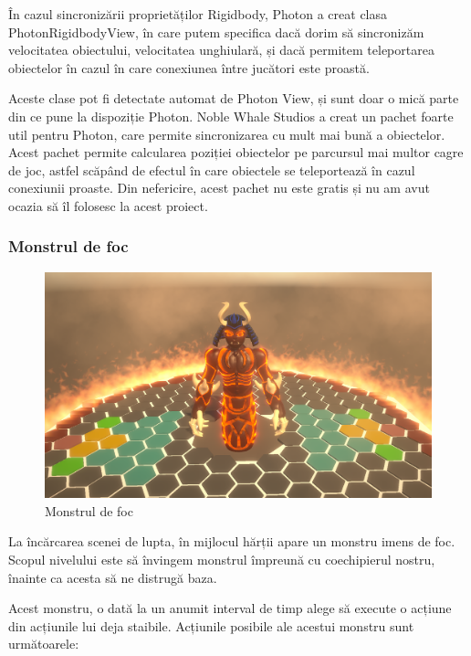 \documentclass[12pt, a4paper]{article}
\begin{document}
	În cazul sincronizării proprietăților Rigidbody, Photon a creat clasa PhotonRigidbodyView, în care putem specifica dacă dorim să sincronizăm velocitatea obiectului, velocitatea unghiulară, și dacă permitem teleportarea obiectelor în cazul în care conexiunea între jucători este proastă.
	\newline
	
	Aceste clase pot fi detectate automat de Photon View, și sunt doar o mică parte din ce pune la dispoziție Photon. Noble Whale Studios a creat un pachet foarte util pentru Photon, care permite sincronizarea cu mult mai bună a obiectelor. Acest pachet permite calcularea poziției obiectelor pe parcursul mai multor cagre de joc, astfel scăpând de efectul în care obiectele se teleportează în cazul conexiunii proaste. Din nefericire, acest pachet nu este gratis și nu am avut ocazia să îl folosesc la acest proiect.
	
	
	
	
	
	\subsubsection{Monstrul de foc}
	\label{section: boss}
	
	\begin{figure}[H]
		\centering
		\includegraphics[width=1\textwidth]{fireDemon.png}
		\caption{Monstrul de foc}
		\label{fig: fireDemon}
	\end{figure}
	
	La încărcarea scenei de lupta, în mijlocul hărții apare un monstru imens de foc. Scopul nivelului este să învingem monstrul împreună cu coechipierul nostru, înainte ca acesta să ne distrugă baza.
	
	Acest monstru, o dată la un anumit interval de timp alege să execute o acțiune din acțiunile lui deja staibile. Acțiunile posibile ale acestui monstru sunt următoarele:
	
\end{document}

